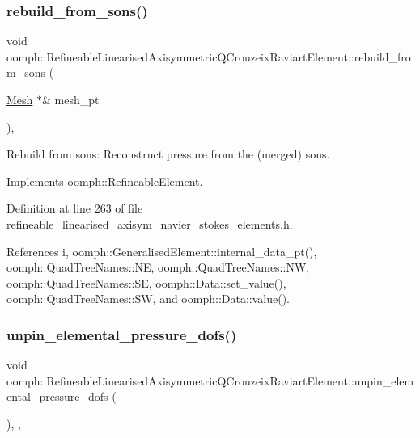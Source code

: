 \subsubsection{\texorpdfstring{rebuild\+\_\+from\+\_\+sons()}{rebuild\_from\_sons()}}
{\footnotesize\ttfamily void oomph\+::\+Refineable\+Linearised\+Axisymmetric\+Q\+Crouzeix\+Raviart\+Element\+::rebuild\+\_\+from\+\_\+sons (\begin{DoxyParamCaption}\item[{\hyperlink{classoomph_1_1Mesh}{Mesh} $\ast$\&}]{mesh\+\_\+pt }\end{DoxyParamCaption})\hspace{0.3cm}{\ttfamily [inline]}, {\ttfamily [virtual]}}



Rebuild from sons\+: Reconstruct pressure from the (merged) sons. 



Implements \hyperlink{classoomph_1_1RefineableElement_a33324be27833fa4b78279d17158215fa}{oomph\+::\+Refineable\+Element}.



Definition at line 263 of file refineable\+\_\+linearised\+\_\+axisym\+\_\+navier\+\_\+stokes\+\_\+elements.\+h.



References i, oomph\+::\+Generalised\+Element\+::internal\+\_\+data\+\_\+pt(), oomph\+::\+Quad\+Tree\+Names\+::\+NE, oomph\+::\+Quad\+Tree\+Names\+::\+NW, oomph\+::\+Quad\+Tree\+Names\+::\+SE, oomph\+::\+Data\+::set\+\_\+value(), oomph\+::\+Quad\+Tree\+Names\+::\+SW, and oomph\+::\+Data\+::value().

\mbox{\label{classoomph_1_1RefineableLinearisedAxisymmetricQCrouzeixRaviartElement_ab531f0a504465f6242f931dc5c01f008}} 
\subsubsection{\texorpdfstring{unpin\+\_\+elemental\+\_\+pressure\+\_\+dofs()}{unpin\_elemental\_pressure\_dofs()}}
{\footnotesize\ttfamily void oomph\+::\+Refineable\+Linearised\+Axisymmetric\+Q\+Crouzeix\+Raviart\+Element\+::unpin\+\_\+elemental\+\_\+pressure\+\_\+dofs (\begin{DoxyParamCaption}{ }\end{DoxyParamCaption})\hspace{0.3cm}{\ttfamily [inline]}, {\ttfamily [private]}, {\ttfamily [virtual]}}



